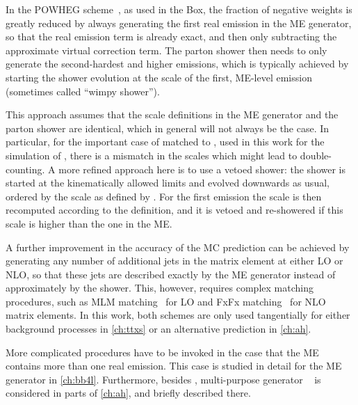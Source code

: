 In the POWHEG scheme~\cite{Powheg:2004,Powheg:2007}, as used in the \powheg Box, the fraction of negative weights is greatly reduced by always generating the first real emission in the ME generator, so that the real emission term is already exact, and then only subtracting the approximate virtual correction term. The parton shower then needs to only generate the second-hardest and higher emissions, which is typically achieved by starting the shower evolution at the scale of the first, ME-level emission (sometimes called ``wimpy shower'').


This approach assumes that the scale definitions in the ME generator and the parton shower are identical, which in general will not always be the case. In particular, for the important case of \powheg matched to \pythia, used in this work for the simulation of \pptt, there is a mismatch in the scales which might lead to double-counting. A more refined approach here is to use a vetoed shower: the shower is started at the kinematically allowed limits and evolved downwards as usual, ordered by the scale as defined by \pythia. For the first emission the scale is then recomputed according to the \powheg definition, and it is vetoed and re-showered if this scale is higher than the one in the ME.

A further improvement in the accuracy of the MC prediction can be achieved by generating any number of additional jets in the matrix element at either LO or NLO, so that these jets are described exactly by the ME generator instead of approximately by the shower. This, however, requires complex matching procedures, such as MLM matching~\cite{Mangano:2006rw} for LO and FxFx matching~\cite{Frederix:2012ps} for NLO matrix elements. In this work, both schemes are only used tangentially for either background processes in \cref{ch:ttxs} or an alternative \ttbar prediction in \cref{ch:ah}.

More complicated procedures have to be invoked in the case that the ME contains more than one real emission. This case is studied in detail for the ME generator \bbfourl in \cref{ch:bb4l}. Furthermore, besides \pythia, multi-purpose generator \herwig~\cite{Bellm:2015jjp,Bahr:2008pv} is considered in parts of \cref{ch:ah}, and briefly described there.

